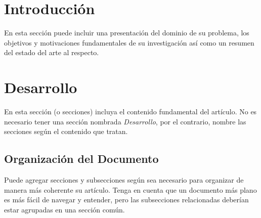 \documentclass[a4paper,10pt,twocolumn]{article}
\begin{document}
\vspace{0.8cm}




\section{Introducción}\label{sec:intro}
  En esta sección puede incluir una presentación del dominio de su problema,
  los objetivos y motivaciones fundamentales de su investigación así como un
  resumen del estado del arte al respecto.




\section{Desarrollo}\label{sec:dev}
  En esta sección (o secciones) incluya el contenido fundamental del artículo.
  No es necesario tener una sección nombrada \emph{Desarrollo}, por el contrario,
  nombre las secciones según el contenido que tratan.

	\subsection{Organización del Documento}\label{sub:results}
		Puede agregar secciones y subsecciones según sea necesario para organizar
		de manera más coherente su artículo. Tenga en cuenta que un documento más
		plano es más fácil de navegar y entender, pero las subsecciones relacionadas
		deberían estar agrupadas en una sección común.
\end{document}
